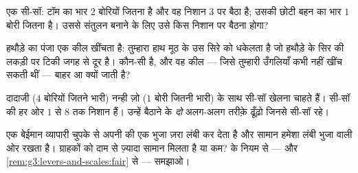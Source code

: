 \begin{exercise}[$\star$]\label{exo:g3:levers-and-scales:8}
एक सी-सॉ: टॉम का भार $2$ बोरियों जितना है और वह निशान $3$ पर बैठा
है; उसकी छोटी बहन का भार $1$ बोरी जितना है। उससे संतुलन बनाने के लिए
उसे किस निशान पर बैठना होगा?
\end{exercise}

\begin{exercise}[$\star$]\label{exo:g3:levers-and-scales:9}
हथौड़े का पंजा एक कील खींचता है: तुम्हारा हाथ मूठ के उस सिरे को
धकेलता है जो हथौड़े के सिर की लकड़ी पर टिकी जगह से दूर है। 
कौन-सी है, और वह कील --- जिसे तुम्हारी उँगलियाँ कभी नहीं खींच सकती
थीं --- बाहर आ क्यों जाती है?
\end{exercise}

\begin{exercise}[$\star\star$]\label{exo:g3:levers-and-scales:10}
दादाजी ($4$ बोरियों जितने भारी) नन्ही ज़ो ($1$ बोरी जितनी भारी) के
साथ सी-सॉ खेलना चाहते हैं। सी-सॉ की हर ओर $1$ से $8$ तक निशान हैं।
उन्हें बैठाने के \emph{दो} अलग-अलग तरीक़े ढूँढ़ो जिनसे सी-सॉ 
रहे।
\end{exercise}

\begin{exercise}[$\star\star$]\label{exo:g3:levers-and-scales:11}
एक बेईमान व्यापारी चुपके से अपनी  की एक भुजा ज़रा लंबी कर देता है
और सामान हमेशा लंबी भुजा वाली ओर रखता है। ग्राहकों को दाम से ज़्यादा
सामान मिलता है या कम?  के नियम से --- और
\cref{rem:g3:levers-and-scales:fair} से --- समझाओ।
\end{exercise}
